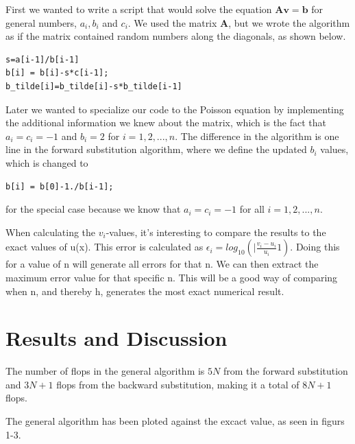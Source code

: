 \documentclass[%
oneside,                 %
final,                   %
10pt]{article}
\begin{document}
First we wanted to write a script that would solve the equation $\mathbf{Av}=\mathbf{b}$ for general numbers,
$a_i, b_i$ and $c_i$. We used the matrix $\mathbf A$, but we wrote the algorithm as if the matrix contained random numbers along the diagonals, as shown below. 
\begin{lstlisting}
s=a[i-1]/b[i-1]
b[i] = b[i]-s*c[i-1];
b_tilde[i]=b_tilde[i]-s*b_tilde[i-1]
\end{lstlisting}

Later we wanted to specialize our code to the Poisson equation by implementing the additional information we knew about the matrix, which is the fact that $a_i=c_i=-1$ and $b_i=2$ for $i=1, 2, ..., n$. The difference in the algorithm is one line in the forward substitution algorithm, where we define the updated $b_i$ values, which is changed to

\begin{lstlisting}
b[i] = b[0]-1./b[i-1];
\end{lstlisting}
for the special case because we know that $a_i=c_i=-1$ for all $i=1, 2, ..., n$.

When calculating the $v_i$-values, it's interesting to compare the results to the exact values of u(x). This error is calculated as $\epsilon_{i}=log_{10}(|\frac{v_i-u_i}{u_i}1)$. Doing this for a value of n will generate all errors for that n. We can then extract the maximum error value for that specific n. This will be a good way of comparing when n, and thereby h, generates the most exact numerical result.


\newpage{}
\section{Results and Discussion}
The number of flops in the general algorithm is $5N$ from the forward substitution and $3N+1$ flops
from the backward substitution, making it a total of $8N+1$ flops. 

The general algorithm has been ploted against the excact value, as seen in figurs 1-3.
\end{document}
